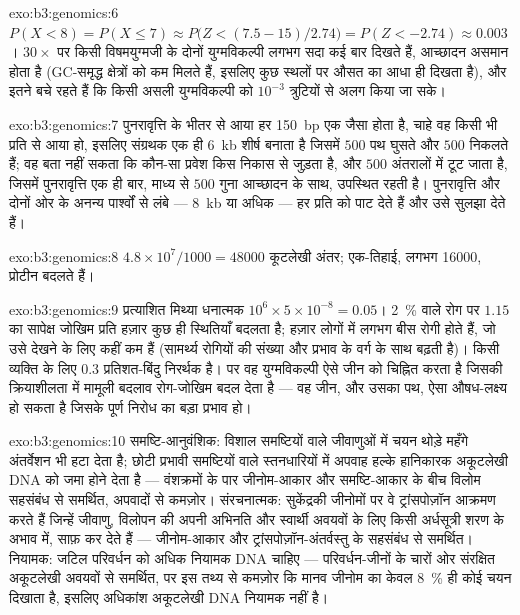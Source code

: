 \begin{solution}{exo:b3:genomics:6}
$P(X < 8) = P(X \le 7) \approx P\bigl(Z < (7.5 - 15)/2.74\bigr) =
P(Z < -2.74) \approx 0.003$। $30\times$ पर किसी विषमयुग्मजी के दोनों
युग्मविकल्पी लगभग सदा कई बार दिखते हैं, आच्छादन असमान होता है (GC-समृद्ध
क्षेत्रों को कम  मिलते हैं, इसलिए कुछ स्थलों पर औसत का आधा ही
दिखता है), और इतने  बचे रहते हैं कि किसी असली युग्मविकल्पी को
$10^{-3}$ त्रुटियों से अलग किया जा सके।
\end{solution}

\begin{solution}{exo:b3:genomics:7}
पुनरावृत्ति के भीतर से आया हर \qty{150}{bp}  एक जैसा होता है, चाहे
वह किसी भी प्रति से आया हो, इसलिए संग्रथक एक ही \qty{6}{kb} शीर्ष
बनाता है जिसमें $500$ पथ घुसते और $500$ निकलते हैं; वह बता नहीं सकता कि
कौन-सा प्रवेश किस निकास से जुड़ता है, और  $500$ अंतरालों में टूट
जाता है, जिसमें पुनरावृत्ति एक ही बार, माध्य से $500$ गुना आच्छादन के
साथ, उपस्थित रहती है। पुनरावृत्ति और दोनों ओर के अनन्य पार्श्वों से
लंबे  --- \qty{8}{kb} या अधिक --- हर प्रति को पाट देते हैं और उसे
सुलझा देते हैं।
\end{solution}

\begin{solution}{exo:b3:genomics:8}
$4.8\times 10^{7}/1000 = \num{48000}$ कूटलेखी अंतर; एक-तिहाई, लगभग
\num{16000}, प्रोटीन बदलते हैं।
\end{solution}

\begin{solution}{exo:b3:genomics:9}
प्रत्याशित मिथ्या धनात्मक $10^{6}\times 5\times 10^{-8} = 0.05$।
\qty{2}{\%} वाले रोग पर $1.15$ का सापेक्ष जोखिम प्रति हज़ार कुछ ही
स्थितियाँ बदलता है; हज़ार लोगों में लगभग बीस रोगी होते हैं, जो उसे
देखने के लिए कहीं कम हैं (सामर्थ्य रोगियों की संख्या और प्रभाव के वर्ग
के साथ बढ़ती है)। किसी व्यक्ति के लिए $0.3$ प्रतिशत-बिंदु निरर्थक है।
पर वह युग्मविकल्पी ऐसे जीन को चिह्नित करता है जिसकी क्रियाशीलता में
मामूली बदलाव रोग-जोखिम बदल देता है --- वह जीन, और उसका पथ, ऐसा
औषध-लक्ष्य हो सकता है जिसके पूर्ण निरोध का बड़ा प्रभाव हो।
\end{solution}

\begin{solution}{exo:b3:genomics:10}
समष्टि-आनुवंशिक: विशाल समष्टियों वाले जीवाणुओं में चयन थोड़े महँगे
अंतर्वेशन भी हटा देता है; छोटी प्रभावी समष्टियों वाले स्तनधारियों में
अपवाह हल्के हानिकारक अकूटलेखी DNA को जमा होने देता है --- वंशक्रमों के
पार जीनोम-आकार और समष्टि-आकार के बीच विलोम सहसंबंध से समर्थित, अपवादों
से कमज़ोर। संरचनात्मक: सुकेंद्रकी जीनोमों पर वे ट्रांसपोज़ॉन आक्रमण
करते हैं जिन्हें जीवाणु, विलोपन की अपनी अभिनति और स्वार्थी अवयवों के
लिए किसी अर्धसूत्री शरण के अभाव में, साफ़ कर देते हैं --- जीनोम-आकार और
ट्रांसपोज़ॉन-अंतर्वस्तु के सहसंबंध से समर्थित। नियामक: जटिल परिवर्धन को
अधिक नियामक DNA चाहिए --- परिवर्धन-जीनों के चारों ओर संरक्षित अकूटलेखी
अवयवों से समर्थित, पर इस तथ्य से कमज़ोर कि मानव जीनोम का केवल
\qty{8}{\%} ही कोई चयन दिखाता है, इसलिए अधिकांश अकूटलेखी DNA नियामक
नहीं है।
\end{solution}

